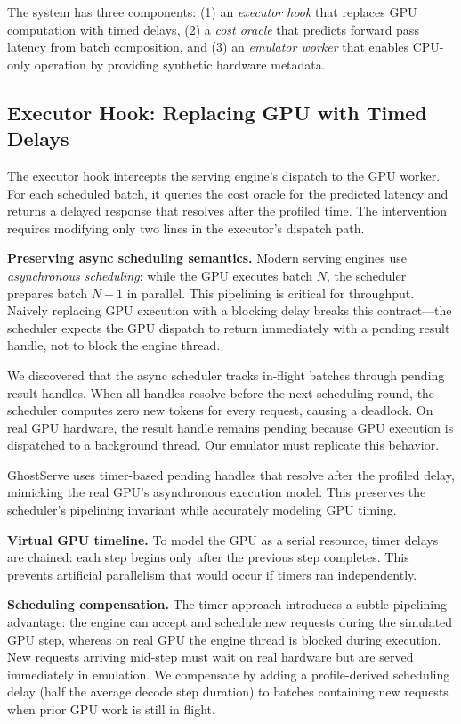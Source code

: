 \documentclass[conference]{IEEEtran}
\newcommand{\sysname}{GhostServe}
\begin{document}
The system has three components: (1) an \emph{executor hook} that replaces GPU computation with timed delays, (2) a \emph{cost oracle} that predicts forward pass latency from batch composition, and (3) an \emph{emulator worker} that enables CPU-only operation by providing synthetic hardware metadata.

\subsection{Executor Hook: Replacing GPU with Timed Delays}
\label{sec:hook}

The executor hook intercepts the serving engine's dispatch to the GPU worker. For each scheduled batch, it queries the cost oracle for the predicted latency and returns a delayed response that resolves after the profiled time. The intervention requires modifying only two lines in the executor's dispatch path.

\textbf{Preserving async scheduling semantics.} Modern serving engines use \emph{asynchronous scheduling}: while the GPU executes batch $N$, the scheduler prepares batch $N{+}1$ in parallel. This pipelining is critical for throughput. Naively replacing GPU execution with a blocking delay breaks this contract---the scheduler expects the GPU dispatch to return immediately with a pending result handle, not to block the engine thread.

We discovered that the async scheduler tracks in-flight batches through pending result handles. When all handles resolve before the next scheduling round, the scheduler computes zero new tokens for every request, causing a deadlock. On real GPU hardware, the result handle remains pending because GPU execution is dispatched to a background thread. Our emulator must replicate this behavior.

\sysname{} uses timer-based pending handles that resolve after the profiled delay, mimicking the real GPU's asynchronous execution model. This preserves the scheduler's pipelining invariant while accurately modeling GPU timing.

\textbf{Virtual GPU timeline.} To model the GPU as a serial resource, timer delays are chained: each step begins only after the previous step completes. This prevents artificial parallelism that would occur if timers ran independently.

\textbf{Scheduling compensation.} The timer approach introduces a subtle pipelining advantage: the engine can accept and schedule new requests during the simulated GPU step, whereas on real GPU the engine thread is blocked during execution. New requests arriving mid-step must wait on real hardware but are served immediately in emulation. We compensate by adding a profile-derived scheduling delay (half the average decode step duration) to batches containing new requests when prior GPU work is still in flight.
\end{document}
